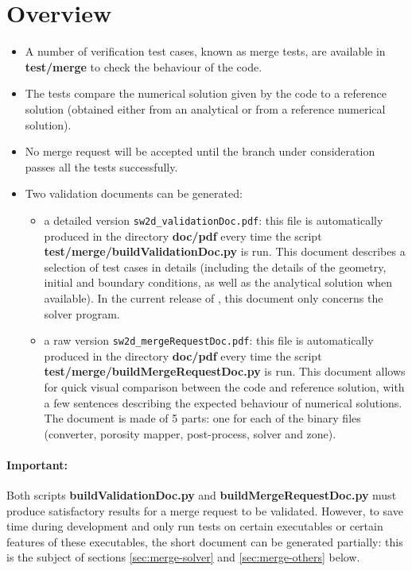 \section{Overview}
\begin{itemize}
\item A number of verification test cases, known as merge tests, are available in \textbf{test/merge} to check the behaviour of the code.
\item The tests compare the numerical solution given by the code to a reference solution (obtained either from an analytical or from a reference numerical solution).
\item No merge request will be accepted until the branch under consideration passes all the tests successfully.
\item Two validation documents can be generated:
\begin{itemize}
    \item a detailed version \texttt{sw2d\_validationDoc.pdf}: this file is automatically produced in the directory \textbf{doc/pdf} 
every time the script \textbf{test/merge/buildValidationDoc.py} is run. This document describes a selection of test cases in details 
(including the details of the geometry, initial and boundary conditions, as well as the analytical solution when available). 
In the current release of \swdd, this document only concerns the solver program.
    \item a raw version \texttt{sw2d\_mergeRequestDoc.pdf}: this file is automatically produced in the directory \textbf{doc/pdf} 
every time the script \textbf{test/merge/buildMergeRequestDoc.py} is run. This document allows for quick visual comparison between the code 
and reference solution, with a few sentences describing the expected behaviour of numerical solutions. The document is made of 5 parts: 
one for each of the binary files (converter, porosity mapper, post-process, solver and zone).

\end{itemize}
\end{itemize}

\paragraph{Important:} Both scripts \textbf{buildValidationDoc.py} and \textbf{buildMergeRequestDoc.py} must produce satisfactory 
results for a merge request to be validated. However, to save time during development and only run tests on certain executables or 
certain features of these executables, the short document can be generated partially: this is the subject of sections 
\ref{sec:merge-solver} and \ref{sec:merge-others} below.

